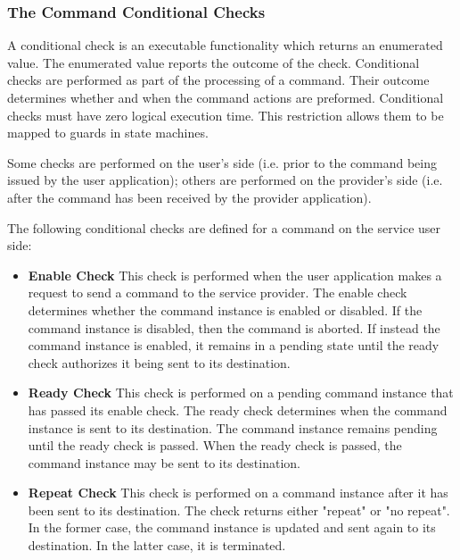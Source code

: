 \subsubsection{The Command Conditional Checks}\label{sec:CmdCondChecks}

A conditional check is an executable functionality which returns an enumerated value. The enumerated value reports the outcome of the check. Conditional checks are performed as part of the processing of a command. Their outcome determines whether and when the command actions are preformed. Conditional checks must have zero logical execution time. This restriction allows them to be mapped to guards in state machines. 

Some checks are performed on the user's side (i.e. prior to the command being issued by the user application); others are performed on the provider's side (i.e. after the command has been received by the provider application). 

The following conditional checks are defined for a command on the service user side:

\begin{itemize}
\item \textbf{Enable Check}
This check is performed when the user application makes a request to send a command to the service provider. The enable check determines whether the command instance is enabled or disabled. If the command instance is disabled, then the command is aborted. If instead the command instance is enabled, it remains in a pending state until the ready check authorizes it being sent to its destination.

\item \textbf{Ready Check}
This check is performed on a pending command instance that has passed its enable check. The ready check determines when the command instance is sent to its destination.  The command instance remains pending until the ready check is passed. When the ready check is passed, the command instance may be sent to its destination. 

\item \textbf{Repeat Check}
This check is performed on a command instance after it has been sent to its destination. The check returns either "repeat" or "no repeat". In the former case, the command instance is updated and sent again to its destination. In the latter case, it is terminated.
\end{itemize}

